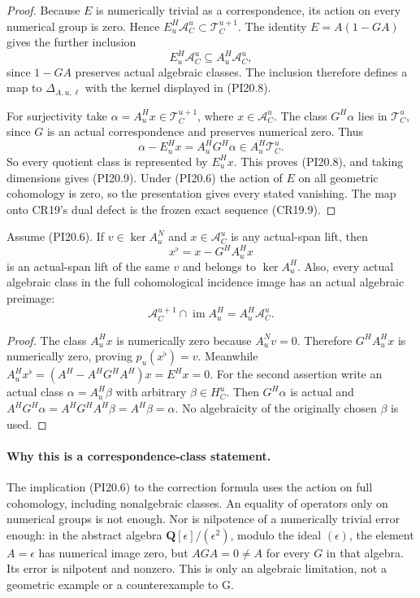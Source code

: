 \begin{proof}
Because $E$ is numerically trivial as a correspondence, its action
on every numerical group is zero.  Hence
$E^H_u\mathscr A_C^u\subset\mathscr T_C^{u+1}$.
The identity $E=A(1-GA)$ gives the further inclusion
\[
 E^H_u\mathscr A_C^u
       \subseteq A^H_u\mathscr A_C^u,
\]
since $1-GA$ preserves actual algebraic classes.  The inclusion
therefore defines a map to $\Delta_{A,u,\ell}$ with the kernel
displayed in (PI20.8).

For surjectivity take $\alpha=A^H_ux\in\mathscr T_C^{u+1}$,
where $x\in\mathscr A_C^u$.  The class $G^H\alpha$ lies in
$\mathscr T_C^u$, since $G$ is an actual correspondence and
preserves numerical zero.  Thus
\[
 \alpha-E^H_ux=A^H_uG^H\alpha\in A^H_u\mathscr T_C^u.
 \tag{PI20.10}\label{r20pi:erroronto}
\]
So every quotient class is represented by $E^H_ux$.
This proves (PI20.8), and taking dimensions gives (PI20.9).
Under (PI20.6) the action of $E$ on all geometric cohomology is
zero, so the presentation gives every stated vanishing.
The map onto CR19's dual defect is the frozen exact sequence
(CR19.9).
\end{proof}

\begin{corollary}
\label{r20pi:correctedlift}
Assume (PI20.6).  If $v\in\ker A^N_u$ and
$x\in\mathscr A_C^u$ is any actual-span lift, then
\[
                         x^{\flat}=x-G^HA^H_ux
 \tag{PI20.11}\label{r20pi:lift}
\]
is an actual-span lift of the same $v$ and belongs to $\ker A^H_u$.
Also, every actual algebraic class in the full cohomological
incidence image has an actual algebraic preimage:
\[
 \mathscr A_C^{u+1}\cap\operatorname{im}A^H_u
                        =A^H_u\mathscr A_C^u.
 \tag{PI20.12}\label{r20pi:imageexact}
\]
\end{corollary}

\begin{proof}
The class $A^H_ux$ is numerically zero because $A^N_uv=0$.
Therefore $G^HA^H_ux$ is numerically zero, proving
$p_u(x^{\flat})=v$.  Meanwhile
$A^H_ux^{\flat}=(A^H- A^HG^HA^H)x=E^Hx=0$.
For the second assertion write an actual class
$\alpha=A^H_u\beta$ with arbitrary $\beta\in H_C^u$.
Then $G^H\alpha$ is actual and
$A^HG^H\alpha=A^HG^HA^H\beta=A^H\beta=\alpha$.
No algebraicity of the originally chosen $\beta$ is used.
\end{proof}

\paragraph{Why this is a correspondence-class statement.}
The implication (PI20.6) to the correction formula uses the action
on full cohomology, including nonalgebraic classes.  An equality
of operators only on numerical groups is not enough.  Nor is
nilpotence of a numerically trivial error enough: in the abstract
algebra $\mathbf Q[\epsilon]/(\epsilon^2)$, modulo the ideal
$(\epsilon)$, the element $A=\epsilon$ has numerical image zero,
but $AGA=0\ne A$ for every $G$ in that algebra.  Its error is
nilpotent and nonzero.  This is only an algebraic limitation, not
a geometric example or a counterexample to G.

